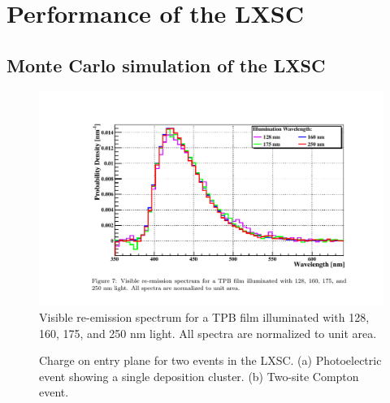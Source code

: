 \section{Performance of the LXSC}
\label{sec.mc}

\subsection{Monte Carlo simulation of the LXSC}

\begin{figure}[!bhtp]
	\centering
	\includegraphics[scale=0.8]{img/TPBSpectrum.pdf}
	
	\caption{\label{fig.tpb} Visible re-emission spectrum for a TPB film illuminated with 128, 160, 175, and 250 nm light. All spectra are normalized to unit area.}
\end{figure}

\begin{figure}[!htb]
	\centering
	\caption{\label{fig.events}  Charge on entry plane for two events in the LXSC. (a) Photoelectric event showing a single deposition cluster. (b) Two-site Compton event.}
\end{figure}

